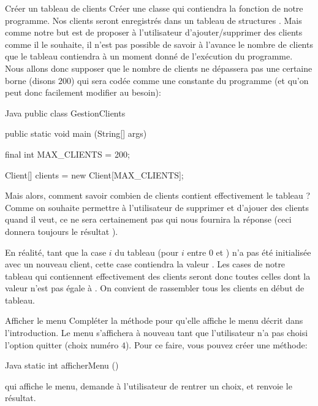 \documentclass[a4paper,11pt]{style-esi/td}
\begin{document}
	\newpage

 
 	\begin{Exercice}{Cr\'eer un tableau de clients}
	Cr\'eer une classe  qui contiendra la fonction  de notre programme. Nos clients seront enregistr\'es dans un tableau de structures . Mais comme notre but est de proposer \`a l'utilisateur d'ajouter/supprimer des clients comme il le souhaite, il n'est pas possible de savoir \`a l'avance le nombre de clients que le tableau contiendra \`a un moment donn\'e de l'ex\'ecution du programme. Nous allons donc supposer que le nombre de clients ne dépassera pas une certaine borne (disons $200$) qui sera cod\'ee comme une constante du programme (et qu'on peut donc facilement modifier au besoin):
	
		\begin{Code}{Java} 
			public class GestionClients
			{	
				public static void main (String[] args)
				{
				        final int MAX_CLIENTS = 200;
				        				
				        Client[] clients = new Client[MAX_CLIENTS];
				}
			}
		\end{Code}
Mais alors, comment savoir combien de clients contient effectivement le tableau ? Comme on souhaite permettre \`a l'utilisateur de supprimer et d'ajouer des clients quand il veut, ce ne sera certainement pas  qui nous fournira la réponse (ceci donnera toujours le r\'esultat ).

En réalité, tant que la case $i$ du tableau (pour $i$ entre $0$ et ) n'a pas été initialisée avec un nouveau client, cette case contiendra la valeur . Les cases de notre tableau qui contiennent effectivement des clients seront donc toutes celles dont la valeur n'est pas égale à . On convient de rassembler tous les clients en d\'ebut de tableau.
\end{Exercice}	

 \begin{Exercice}{Afficher le menu}
 	    Compl\'eter la m\'ethode  pour qu'elle affiche le menu d\'ecrit dans l'introduction. Le menu s'affichera \`a nouveau tant que l'utilisateur n'a pas choisi l'option quitter (choix num\'ero $4$). Pour ce faire, vous pouvez cr\'eer une m\'ethode:
	    
     \begin{Code}{Java}
		   static int afficherMenu ()
     \end{Code}	    		
qui affiche le menu, demande \`a l'utilisateur de rentrer un choix, et renvoie le r\'esultat.
		
  \end{Exercice}
  
\end{document}

